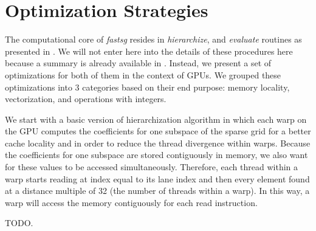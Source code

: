 \section{Optimization Strategies}

% 

The computational core of \textit{fastsg} resides in \textit{hierarchize}, and
\textit{evaluate} routines as presented in \cite{}. We will not enter here into
the details of these procedures here because a summary is already available in
\cite{murarasu2011}. Instead, we present a set of optimizations for both of them
in the context of GPUs. We grouped these optimizations into 3 categories based
on their end purpose: memory locality, vectorization, and operations with
integers.

We start with a basic version of hierarchization algorithm in which each warp
on the GPU computes the coefficients for one subspace of the sparse grid for a
better cache locality and in order to reduce the thread divergence within warps.
Because the coefficients for one subspace are stored contiguously in memory, we
also want for these values to be accessed simultaneously. Therefore, each thread
within a warp starts reading at index equal to its lane index and then every
element found at a distance multiple of 32 (the number of threads within a
warp). In this way, a warp will access the memory contiguously for each read
instruction.

TODO.

